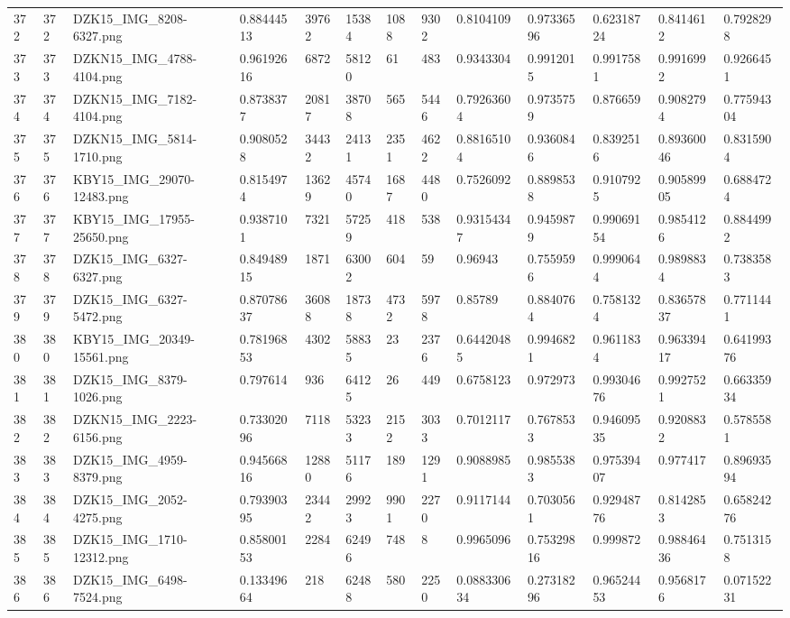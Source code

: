\documentclass[11pt, a4paper, twoside]{report}
\begin{document}
\begin{longtable}[c]{@{}lllllllllllll@{}}
372 & 372 & DZK15\_IMG\_8208-6327.png & 0.88444513 & 39762 & 15384 & 1088 & 9302 & 0.8104109 & 0.97336596 & 0.62318724 & 0.8414612 & 0.7928298 \\
373 & 373 & DZKN15\_IMG\_4788-4104.png & 0.96192616 & 6872 & 58120 & 61 & 483 & 0.9343304 & 0.9912015 & 0.9917581 & 0.9916992 & 0.9266451 \\
374 & 374 & DZKN15\_IMG\_7182-4104.png & 0.8738377 & 20817 & 38708 & 565 & 5446 & 0.79263604 & 0.9735759 & 0.876659 & 0.9082794 & 0.77594304 \\
375 & 375 & DZKN15\_IMG\_5814-1710.png & 0.9080528 & 34432 & 24131 & 2351 & 4622 & 0.88165104 & 0.9360846 & 0.8392516 & 0.89360046 & 0.8315904 \\
376 & 376 & KBY15\_IMG\_29070-12483.png & 0.8154974 & 13629 & 45740 & 1687 & 4480 & 0.7526092 & 0.8898538 & 0.9107925 & 0.90589905 & 0.6884724 \\
377 & 377 & KBY15\_IMG\_17955-25650.png & 0.9387101 & 7321 & 57259 & 418 & 538 & 0.93154347 & 0.9459879 & 0.99069154 & 0.9854126 & 0.8844992 \\
378 & 378 & DZK15\_IMG\_6327-6327.png & 0.84948915 & 1871 & 63002 & 604 & 59 & 0.96943 & 0.7559596 & 0.9990644 & 0.9898834 & 0.7383583 \\
379 & 379 & DZK15\_IMG\_6327-5472.png & 0.87078637 & 36088 & 18738 & 4732 & 5978 & 0.85789 & 0.8840764 & 0.7581324 & 0.83657837 & 0.7711441 \\
380 & 380 & KBY15\_IMG\_20349-15561.png & 0.78196853 & 4302 & 58835 & 23 & 2376 & 0.64420485 & 0.9946821 & 0.9611834 & 0.96339417 & 0.64199376 \\
381 & 381 & DZK15\_IMG\_8379-1026.png & 0.797614 & 936 & 64125 & 26 & 449 & 0.6758123 & 0.972973 & 0.99304676 & 0.9927521 & 0.66335934 \\
382 & 382 & DZKN15\_IMG\_2223-6156.png & 0.73302096 & 7118 & 53233 & 2152 & 3033 & 0.7012117 & 0.7678533 & 0.94609535 & 0.9208832 & 0.5785581 \\
383 & 383 & DZK15\_IMG\_4959-8379.png & 0.94566816 & 12880 & 51176 & 189 & 1291 & 0.9088985 & 0.9855383 & 0.97539407 & 0.977417 & 0.89693594 \\
384 & 384 & DZK15\_IMG\_2052-4275.png & 0.79390395 & 23442 & 29923 & 9901 & 2270 & 0.9117144 & 0.7030561 & 0.92948776 & 0.8142853 & 0.65824276 \\
385 & 385 & DZK15\_IMG\_1710-12312.png & 0.85800153 & 2284 & 62496 & 748 & 8 & 0.9965096 & 0.75329816 & 0.999872 & 0.98846436 & 0.7513158 \\
386 & 386 & DZK15\_IMG\_6498-7524.png & 0.13349664 & 218 & 62488 & 580 & 2250 & 0.088330634 & 0.27318296 & 0.96524453 & 0.9568176 & 0.07152231 \\

\end{longtable}
\end{document}
